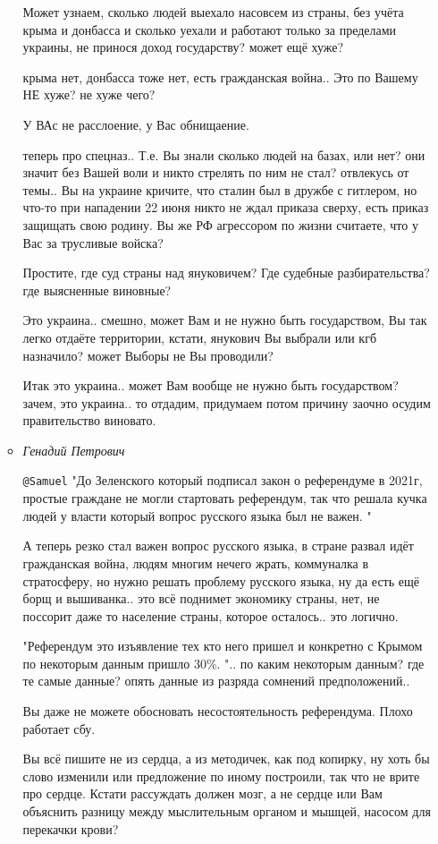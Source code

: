 \begin{itemize}
\begin{itemize}
Может узнаем, сколько людей выехало насовсем из страны, без учёта крыма и
донбасса и сколько уехали и работают только за пределами украины, не принося
доход государству? может ещё хуже? 

крыма нет, донбасса тоже нет, есть гражданская война.. Это по Вашему НЕ хуже?
не хуже чего?

У ВАс не расслоение, у Вас обнищаение.

теперь про спецназ.. Т.е. Вы знали сколько людей на базах, или нет? они значит
без Вашей воли и никто стрелять по ним не стал? отвлекусь от темы.. Вы на
украине кричите, что сталин был в дружбе с гитлером, но что-то при нападении
22 июня никто не ждал приказа сверху, есть приказ защищать свою родину. Вы же
РФ агрессором по жизни считаете, что у Вас за трусливые войска?

Простите, где суд страны над януковичем?  Где судебные разбирательства? где
выясненные виновные?

Это украина.. смешно, может Вам и не нужно быть государством, Вы так легко
отдаёте территории, кстати, янукович Вы выбрали или кгб назначило? может
Выборы не Вы проводили?

Итак это украина.. может Вам вообще не нужно быть государством? зачем, это
украина.. то отдадим, придумаем потом причину заочно осудим правительство
виновато.


\item \emph{Генадий Петрович}

\verb|@Samuel|  "До Зеленского который подписал закон о референдуме в 2021г,
простые граждане не могли стартовать референдум, так что решала кучка людей у
власти который вопрос русского языка был не важен. "

А теперь резко стал важен вопрос русского языка, в стране развал идёт
гражданская война, людям многим нечего жрать, коммуналка в стратосферу, но
нужно решать проблему русского языка, ну да есть ещё борщ и вышиванка.. это всё
поднимет экономику страны, нет, не поссорит даже то население страны, которое
осталось.. это логично.

"Референдум это изъявление тех кто него пришел и конкретно с Крымом по
некоторым данным пришло 30\%. ".. по каким некоторым данным? где те самые
данные? опять данные из разряда сомнений предположений.. 

Вы даже не можете обосновать несостоятельность референдума. Плохо работает сбу.

Вы всё пишите не из сердца, а из методичек, как под копирку, ну хоть бы слово
изменили или предложение по иному построили, так что не врите про сердце.
Кстати рассуждать должен мозг, а не сердце или Вам объяснить разницу между
мыслительным органом и мышцей, насосом для перекачки крови?


\end{itemize}
\end{itemize}
